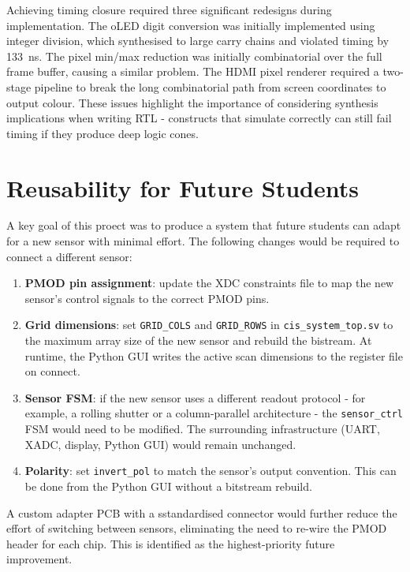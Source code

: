 Achieving timing closure required three significant redesigns during implementation. The oLED digit conversion was initially implemented using integer division, which synthesised to large carry chains and violated timing by 133~ns. The pixel min/max reduction was initially combinatorial over the full frame buffer, causing a similar problem. The HDMI pixel renderer required a two-stage pipeline to break the long combinatorial path from screen coordinates to output colour. These issues highlight the importance of considering synthesis implications when writing RTL - constructs that simulate correctly can still fail timing if they produce deep logic cones.

\section{Reusability for Future Students}

A key goal of this proect was to produce a system that future students can adapt for a new sensor with minimal effort. The following changes would be required to connect a different sensor:

\begin{enumerate}
    \item \textbf{PMOD pin assignment}: update the XDC constraints file to map the new sensor's control signals to the correct PMOD pins.
    \item \textbf{Grid dimensions}: set \texttt{GRID\_COLS} and \texttt{GRID\_ROWS} in \texttt{cis\_system\_top.sv} to the maximum array size of the new sensor and rebuild the bistream. At runtime, the Python GUI writes the active scan dimensions to the register file on connect.
    \item \textbf{Sensor FSM}: if the new sensor uses a different readout protocol - for example, a rolling shutter or a column-parallel architecture - the \texttt{sensor\_ctrl} FSM would need to be modified. The surrounding infrastructure (UART, XADC, display, Python GUI) would remain unchanged.
    \item \textbf{Polarity}: set \texttt{invert\_pol} to match the sensor's output convention. This can be done from the Python GUI without a bitstream rebuild.
\end{enumerate}

A custom adapter PCB with a sstandardised connector would further reduce the effort of switching between sensors, eliminating the need to re-wire the PMOD header for each chip. This is identified as the highest-priority future improvement.

